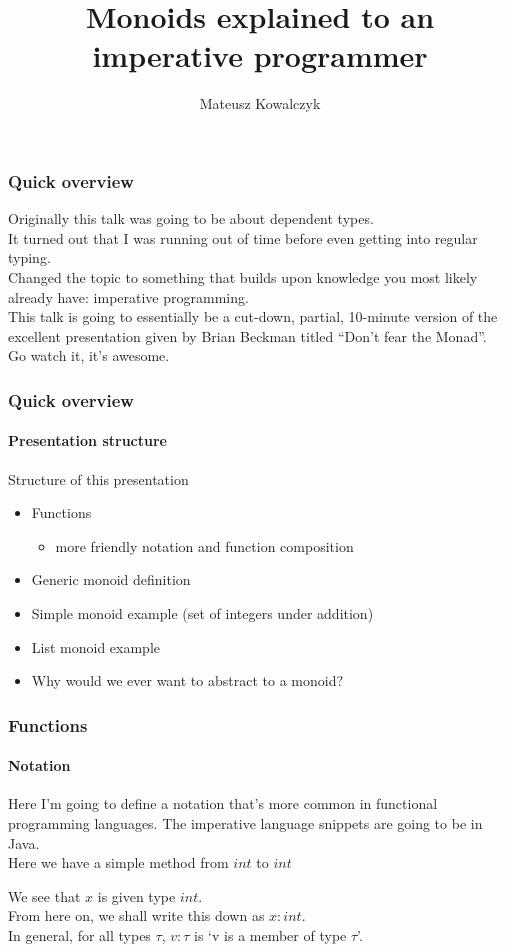 \documentclass{beamer}
\title[Monoids explained]{Monoids explained to an imperative programmer}
\author{Mateusz Kowalczyk}
\institute{University of Bath}
\begin{document}
\begin{frame}
  \titlepage
\end{frame}
\begin{frame}
  \frametitle{Quick overview}
  Originally this talk was going to be about dependent types.\\
  \pause
  It turned out that I was running out of time before even getting
  into regular typing.\\
  \pause
  Changed the topic to something that builds upon knowledge you most
  likely already have: imperative programming.\\
  \pause
  This talk is going to essentially be a cut-down, partial, 10-minute
  version of the excellent presentation given by Brian Beckman titled
  ``Don't fear the Monad''.\\
  \pause
  Go watch it, it's awesome.
\end{frame}
\begin{frame}
  \frametitle{Quick overview}
  \framesubtitle{Presentation structure}
  Structure of this presentation
  \begin{itemize}[<+->]
    \item Functions
      \begin{itemize}
        \item more friendly notation and function composition
      \end{itemize}
    \item Generic monoid definition
    \item Simple monoid example (set of integers under addition)
    \item List monoid example
    \item Why would we ever want to abstract to a monoid?
  \end{itemize}
\end{frame}
\begin{frame}
  \frametitle{Functions}
  \framesubtitle{Notation}
  Here I'm going to define a notation that's more common in functional
  programming languages. The imperative language snippets are going to
  be in Java.\\
  Here we have a simple method from $int$ to $int$
  \pause
  
  \pause
  We see that $x$ is given type $int$.\\
  From here on, we shall write this down as $x:int$.\\
  \pause
  In general, for all types $\tau$, $v:\tau$ is `v is a member of type $\tau$'.
\end{frame}
\end{document}
